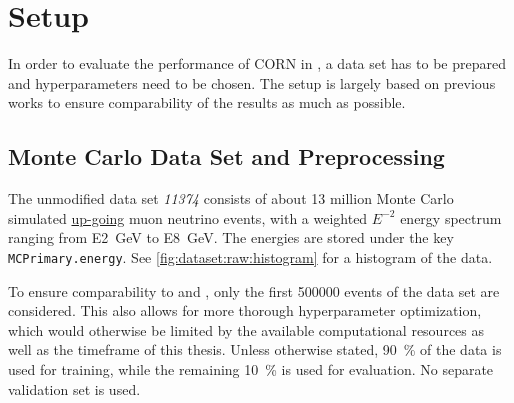 \section{Setup}
In order to evaluate the performance of \ac{CORN} in \dsea{},
a data set has to be prepared
and hyperparameters need to be chosen.
%
The setup is largely based on previous works
  \cite{dsea_jan, dsea_samuel}
to ensure comparability of the results
  as much as possible.


\subsection{Monte Carlo Data Set and Preprocessing}
%
%
The unmodified data set \emph{11374} \cite{icecube_mc} consists of about 13 million Monte Carlo simulated
  \hyperref[sec:neutrino_astronomy:icecube:up_going]{up-going}
  muon neutrino events,
with a weighted $E^{-2}$ energy spectrum
ranging from \SI{E2}{\giga\electronvolt} to \SI{E8}{\giga\electronvolt}.
The energies are stored under the key \texttt{MCPrimary.energy}.
See \autoref{fig:dataset:raw:histogram} for a histogram of the data.

To ensure comparability to \cite{dsea_jan} and \cite{dsea_samuel}, %
only the first \num{500000} events of the data set are considered.
This also allows for more thorough hyperparameter optimization,
which would otherwise be limited by
  the available computational resources
  as well as the timeframe of this thesis.
%
Unless otherwise stated, %
\SI{90}{\percent} of the data is used for training,
while the remaining \SI{10}{\percent} is used for evaluation.
No separate validation set is used.


